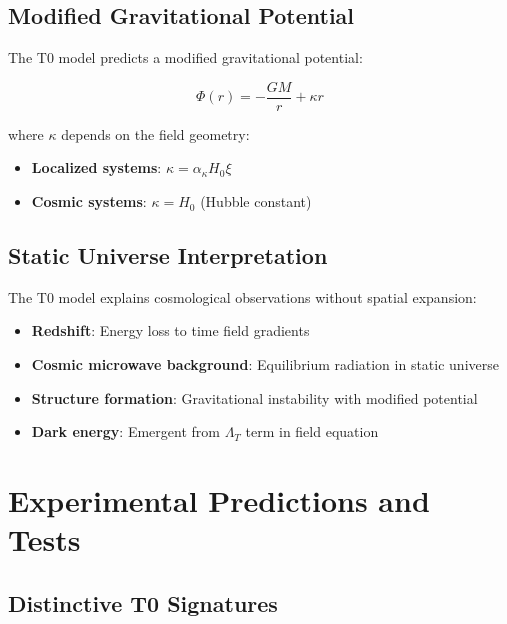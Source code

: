 	\subsection{Modified Gravitational Potential}
	\label{subsec:modified_potential}
	
	The T0 model predicts a modified gravitational potential:
	
	\begin{equation}
		\Phi(r) = -\frac{GM}{r} + \kappa r
		\label{eq:modified_gravitational_potential}
	\end{equation}
	
	where $\kappa$ depends on the field geometry:
	\begin{itemize}
		\item \textbf{Localized systems}: $\kappa = \alpha_\kappa H_0 \xi$
		\item \textbf{Cosmic systems}: $\kappa = H_0$ (Hubble constant)
	\end{itemize}
	

	\subsection{Static Universe Interpretation}
	\label{subsec:static_universe}
	
	The T0 model explains cosmological observations without spatial expansion:
	\begin{itemize}
		\item \textbf{Redshift}: Energy loss to time field gradients
		\item \textbf{Cosmic microwave background}: Equilibrium radiation in static universe
		\item \textbf{Structure formation}: Gravitational instability with modified potential
		\item \textbf{Dark energy}: Emergent from $\Lambda_T$ term in field equation
	\end{itemize}
	
	\section{Experimental Predictions and Tests}
	\label{sec:experimental_predictions}
	
	\subsection{Distinctive T0 Signatures}
	\label{subsec:distinctive_signatures}
	
